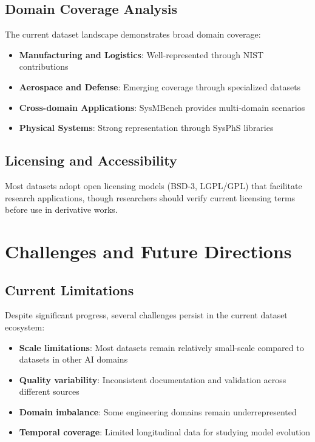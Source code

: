 \documentclass[11pt,a4paper]{article}
\begin{document}
\subsection{Domain Coverage Analysis}

The current dataset landscape demonstrates broad domain coverage:

\begin{itemize}[leftmargin=*]
    \item \textbf{Manufacturing and Logistics}: Well-represented through NIST contributions
    \item \textbf{Aerospace and Defense}: Emerging coverage through specialized datasets
    \item \textbf{Cross-domain Applications}: SysMBench provides multi-domain scenarios
    \item \textbf{Physical Systems}: Strong representation through SysPhS libraries
\end{itemize}

\subsection{Licensing and Accessibility}

Most datasets adopt open licensing models (BSD-3, LGPL/GPL) that facilitate research applications, though researchers should verify current licensing terms before use in derivative works.

\section{Challenges and Future Directions}

\subsection{Current Limitations}

Despite significant progress, several challenges persist in the current dataset ecosystem:

\begin{itemize}[leftmargin=*]
    \item \textbf{Scale limitations}: Most datasets remain relatively small-scale compared to datasets in other AI domains
    \item \textbf{Quality variability}: Inconsistent documentation and validation across different sources
    \item \textbf{Domain imbalance}: Some engineering domains remain underrepresented
    \item \textbf{Temporal coverage}: Limited longitudinal data for studying model evolution
\end{itemize}
\end{document}
